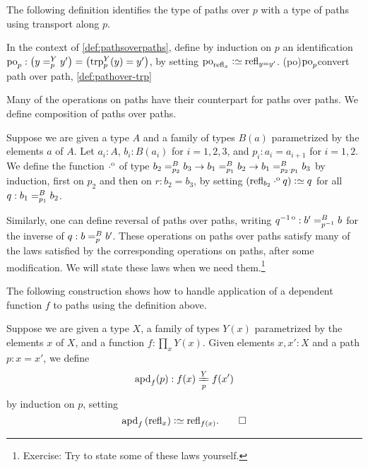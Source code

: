 The following definition identifies the type of paths over $p$ with a type 
of paths using transport along $p$.

\begin{definition}\label{def:pathover-trp}
In the context of \cref{def:pathsoverpaths}, define by induction on $p$ an
identification
$\po_p: \left(\pathover y Y p {y'}\right) = \left( \trp[Y]{p}(y)=y'\right)$,
by setting $\po_{\refl{x}} \defeq \refl{y=y'}$.%
\glossary(po){$\protect\po_p$}{convert path over path, \cref{def:pathover-trp}}
\end{definition}

Many of the operations on paths have their counterpart for paths over paths.
We define composition of paths over paths.

\begin{definition}\label{def:pathovercomposition}
Suppose we are given a type $A$ and a family of types $B(a)$ parametrized by the elements $a$ of $A$. 
Let $a_i:A$, $b_i:B(a_i)$ for $i=1,2,3$, and $p_i : a_i = a_{i+1}$ for $i=1,2$. 
We define the function $\cdot^{\mathrm{o}}$ of type
$\pathover {b_2} B {p_2} {b_3} \to \pathover {b_1} B {p_1} {b_2} \to 
 \pathover {b_1} B {p_2 \cdot p_1} {b_3}$ by induction, first on $p_2$ and then on $r: b_2 = b_3$,
by setting $(\refl{b_2} \cdoto q) \defeq q$ for all $q: \pathover {b_1} B {p_1} {b_2}$.
\end{definition}

Similarly, one can define reversal of paths over paths,
writing $\invo q : \pathover {b'} B {\inv p} b$ for the inverse
of $q : \pathover b B p {b'}$.
These operations on paths over paths
satisfy many of the laws satisfied by the corresponding operations on paths, 
after some modification.
We will state these laws when we need them.\footnote{%
  Exercise: Try to state some of these laws yourself.}

The following construction shows how to handle application of a dependent 
function $f$ to paths using the definition above.

\begin{definition}\label{def:apd}
  Suppose we are given a type $X$, a family of types $Y(x)$ parametrized by the elements $x$ of $X$, and a function $f:\prod_x Y(x)$.
  Given elements $x,x':X$ and a path $p : x = x'$, we define
  \[
    \apd{f}(p) : \pathover {f(x)} Y p {f(x')}
  \]
  by induction on $p$, setting
  \[
    \apd f {(\refl x)} \defeq \refl {f(x)}.\qedhere
  \]
\end{definition}

